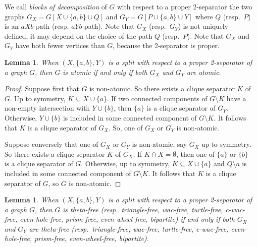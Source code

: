 \documentclass[11pt]{article}
\newtheorem{lemma}[theo]{Lemma}
\newcommand{\sm}{\setminus}
\begin{document}
We call \emph{blocks of decomposition} of $G$ with respect to a proper 2-separator the two graphs $G_X = G[X \cup \{a, b\} \cup Q]$ and $G_Y = G[P \cup \{a, b\} \cup Y ]$ where $Q$ (resp.\ $P$) is an $aXb$-path  (resp. $aYb$-path).
Note that $G_X$ (resp.\ $G_Y$) is not uniquely defined, it may depend on the choice of the path $Q$ (resp.\ $P$). Note that $G_X$ and $G_Y$ have both fewer vertices than $G$, because the 2-separator is proper. 


\begin{lemma}
  \label{l:decProper2sepAtomic}
  When $(X, \{a, b\}, Y)$ is a split with respect to a proper 2-separator of a graph $G$, then $G$ is atomic if and only if both $G_X$ and $G_Y$ are atomic.
\end{lemma}


\begin{proof}
  Suppose first that $G$ is non-atomic.   
  So there exists  a clique separator $K$ of $G$. 
  Up to symmetry, $K\subseteq X\cup \{a\}$.  
  If two connected components of $G\sm K$ have a non-empty intersection with $Y\cup \{b\}$, then $\{a\}$ is a clique separator of $G_Y$.  
  Otherwise, $Y\cup \{b\}$ is included in some connected component of $G\sm K$.   
  It follows that $K$ is a clique separator of $G_X$.  
  So, one of  $G_X$ or $G_Y$ is non-atomic.   

  Suppose conversely that one of $G_X$ or $G_Y$ is non-atomic, say $G_X$ up to symmetry.  
  So there exists a clique separator $K$ of $G_X$.  
  If $K\cap X = \emptyset$, then one of $\{a\}$ or $\{b\}$ is a clique separator of $G$. 
  Otherwise, up to symmetry, $K\subseteq X\cup \{a\}$ and $Q\sm a$ is included in some connected component of $G\sm K$.   
  It follows that $K$ is a clique separator of $G$, so $G$ is non-atomic.
\end{proof}



\begin{lemma}
 \label{l:decProper2sep}
 When $(X, \{a, b\}, Y)$ is a split with respect to a proper
 2-separator of a graph $G$, then $G$ is theta-free (resp.\ triangle-free, wac-free, turtle-free, c-wac-free, even-hole-free, prism-free, even-wheel-free, bipartite) if and only if both $G_X$ and $G_Y$ are theta-free (resp.\ triangle-free, wac-free, turtle-free, c-wac-free, even-hole-free, prism-free, even-wheel-free, bipartite).
\end{lemma}
\end{document}
